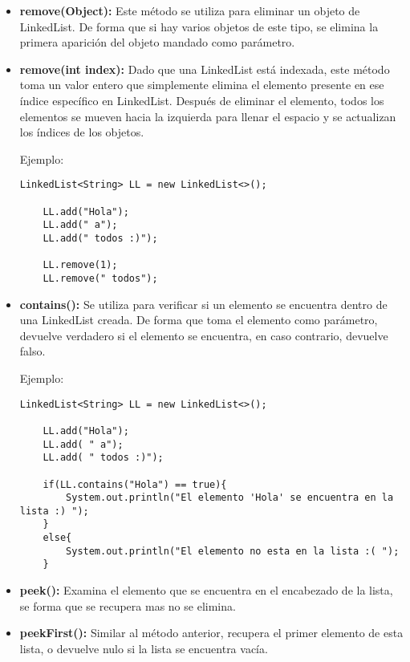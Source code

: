 \documentclass[12pt, letterpaper]{article} %
\begin{document}
\begin{itemize}
    \item \textbf{remove(Object):} Este método se utiliza para eliminar un objeto de LinkedList. De forma que si hay varios objetos de este tipo, se elimina la primera aparición del objeto mandado como parámetro.
    
    \item \textbf{remove(int index):} Dado que una LinkedList está indexada, este método toma un valor entero que simplemente elimina el elemento presente en ese índice específico en LinkedList. Después de eliminar el elemento, todos los elementos se mueven hacia la izquierda para llenar el espacio y se actualizan los índices de los objetos.
    \vspace{10mm}

    Ejemplo:
    \lstset{language = Java, breaklines=true, basicstyle=\footnotesize}
    \begin{lstlisting}[frame=single]
    LinkedList<String> LL = new LinkedList<>();

    LL.add("Hola");  
    LL.add(" a");
    LL.add(" todos :)");

    LL.remove(1);
    LL.remove(" todos");
    \end{lstlisting}
    
    \item \textbf{contains():} Se utiliza para verificar si un elemento se encuentra dentro de una LinkedList creada. De forma que toma el elemento como parámetro, devuelve verdadero si el elemento se encuentra, en caso contrario, devuelve falso.

    Ejemplo:
    \lstset{language = Java, breaklines=true, basicstyle=\footnotesize}
    \begin{lstlisting}[frame=single]
    LinkedList<String> LL = new LinkedList<>();

    LL.add("Hola");  
    LL.add( " a");
    LL.add( " todos :)");

    if(LL.contains("Hola") == true){
        System.out.println("El elemento 'Hola' se encuentra en la lista :) ");
    }
    else{
    	System.out.println("El elemento no esta en la lista :( ");
    }
    \end{lstlisting}
    
    \item \textbf{peek():} Examina el elemento que se encuentra en el encabezado de la lista, se forma que se recupera mas no se elimina.
    
    \item \textbf{peekFirst():} Similar al método anterior, recupera el primer elemento de esta lista, o devuelve nulo si la lista se encuentra vacía.
    

\end{itemize}
\end{document}
